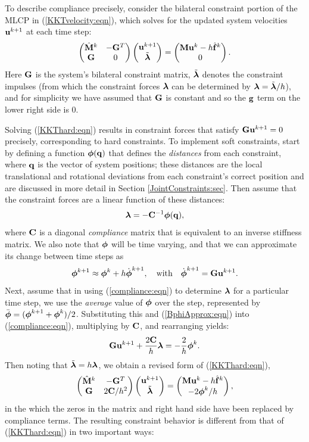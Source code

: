To describe compliance precisely, consider the bilateral constraint
portion of the MLCP in (\ref{KKTvelocity:eqn}), which solves for the
updated system velocities ${\bf u}^{k+1}$ at each time step:
%
\begin{equation}
\left(\begin{matrix}
\hat{{\bf M}}^{k} & -{\bf G}^{T} \\
{\bf G} & 0
\end{matrix}\right)
\left(\begin{matrix}
{\bf u}^{k+1} \\
\tilde{\boldsymbol\lambda}
\end{matrix}\right)
=
\left(\begin{matrix}
{\bf M} {\bf u}^{k} - h \hat{{\bf f}}^{k} \\
0
\end{matrix}\right).
\label{KKThard:eqn}
\end{equation}
%
Here ${\bf G}$ is the system's bilateral constraint matrix, $\tilde{\boldsymbol\lambda}$
denotes the constraint impulses (from which the constraint forces
$\boldsymbol\lambda$ can be determined by $\boldsymbol\lambda = \tilde{\boldsymbol\lambda}/h$), and for
simplicity we have assumed that ${\bf G}$ is constant and so the ${\bf g}$ term
on the lower right side is $0$.

Solving (\ref{KKThard:eqn}) results in constraint forces that satisfy
${\bf G} {\bf u}^{k+1} = 0$ precisely, corresponding to hard constraints. To
implement soft constraints, start by defining a function $\boldsymbol\phi({\bf q})$
that defines the {\it distances} from each constraint, where ${\bf q}$ is the
vector of system positions; these distances are
the local translational and rotational deviations from each
constraint's correct position and are discussed in more detail in
Section \ref{JointConstraints:sec}. Then assume that the constraint
forces are a linear function of these distances:
%
\begin{equation}
\boldsymbol\lambda = -{\bf C}^{-1} \boldsymbol\phi({\bf q}),
\label{compliance:eqn}
\end{equation}
%
where ${\bf C}$ is a diagonal {\it compliance} matrix that is equivalent to
an inverse stiffness matrix. We also note that $\boldsymbol\phi$ will be time
varying, and that we can approximate its change between time steps as
%
\begin{equation}
\boldsymbol\phi^{k+1} \approx \boldsymbol\phi^k + h \dot{\boldsymbol\phi}^{k+1}, \quad \text{with}
\quad \dot{\boldsymbol\phi}^{k+1} = {\bf G} {\bf u}^{k+1}.
\label{BphiApprox:eqn}
\end{equation}
%
Next, assume that in using (\ref{compliance:eqn}) to determine $\boldsymbol\lambda$
for a particular time step, we use the {\it average} value of $\boldsymbol\phi$
over the step, represented by $\bar{\boldsymbol\phi} = (\boldsymbol\phi^{k+1} + \boldsymbol\phi^k)/2$.
Substituting this and (\ref{BphiApprox:eqn}) into
(\ref{compliance:eqn}), multiplying by ${\bf C}$, and rearranging yields:
%
\begin{equation}
{\bf G} {\bf u}^{k+1} + \frac{2 {\bf C}}{h} \boldsymbol\lambda = -\frac{2}{h} \boldsymbol\phi^k.
\end{equation}
%
Then noting that $\tilde{\boldsymbol\lambda} = h \boldsymbol\lambda$, we obtain
a revised form of (\ref{KKThard:eqn}),
%
\begin{equation}
\left(\begin{matrix}
\hat{{\bf M}}^{k} & -{\bf G}^{T} \\
{\bf G} & 2 {\bf C} /h^2 
\end{matrix}\right)
\left(\begin{matrix}
{\bf u}^{k+1} \\
\tilde{\boldsymbol\lambda}
\end{matrix}\right)
=
\left(\begin{matrix}
{\bf M} {\bf u}^{k} - h \hat{{\bf f}}^{k} \\
- 2 \boldsymbol\phi^k/h
\end{matrix}\right),
\label{KKTsoft:eqn}
\end{equation}
%
in the which the zeros in the matrix and right hand side have been
replaced by compliance terms.
The resulting constraint behavior is different from that of
(\ref{KKThard:eqn}) in two important ways:

